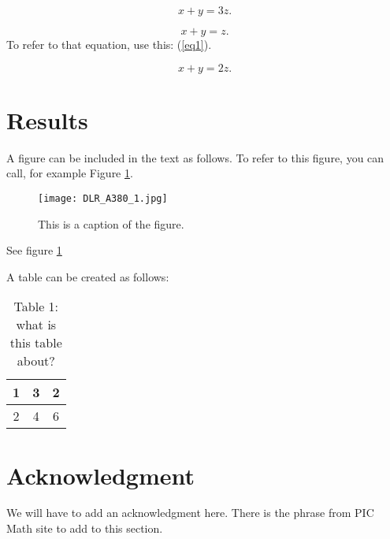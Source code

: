 \documentclass[12pt]{article}
\numberwithin{equation}{section}
\begin{document}
\begin{equation}\label{eq3}
x + y = 3z.
\end{equation}


\begin{equation}\label{eq1}
x + y = z.
\end{equation}
To refer to that equation, use this: (\ref{eq1}). 



\begin{equation}\label{eq2}
x + y = 2z.
\end{equation}



\section{Results}\label{sec:result} 

A figure can be included in the text as follows. To refer to this figure, you can call, for example Figure \ref{fig1}.

\begin{figure}[tph]
\centering
\texttt{[image: DLR\_A380\_1.jpg]}
\caption{This is a caption of the figure.}
\label{fig1}
\end{figure}

See figure \ref{fig1}

A table can be created as follows: 

\begin{table}
\centering
\begin{tabular}{|c|c|c|} %
\hline 
1 & 3 & 2\\
\hline 
2& 4 & 6 \\
\hline
\end{tabular}
\caption{Table 1: what is this table about?}
\label{table1}
\end{table} 
 
 

 \section*{Acknowledgment}
We will have to add an acknowledgment here. There is the phrase from PIC Math site to add to this section. 






%
%
%
\end{document}
